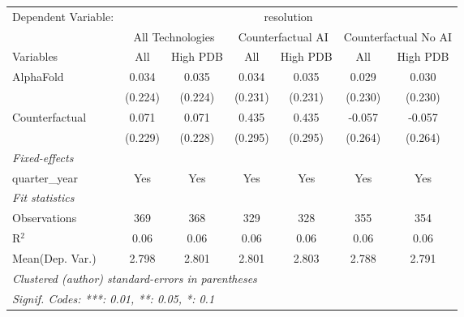 \begingroup
\centering
\begin{tabular}{lcccccc}
   \tabularnewline \midrule \midrule
   Dependent Variable: & \multicolumn{6}{c}{resolution}\\
 & \multicolumn{2}{c}{All Technologies} & \multicolumn{2}{c}{Counterfactual AI} & \multicolumn{2}{c}{Counterfactual No AI} \\
\cmidrule(lr){1-1}\cmidrule(lr){2-3} \cmidrule(lr){4-5} \cmidrule(lr){6-7}
Variables & \multicolumn{1}{c}{All} & \multicolumn{1}{c}{High PDB} & \multicolumn{1}{c}{All} & \multicolumn{1}{c}{High PDB} & \multicolumn{1}{c}{All} & \multicolumn{1}{c}{High PDB} \\
\cmidrule(lr){1-1}\cmidrule(lr){2-2} \cmidrule(lr){3-3} \cmidrule(lr){4-4} \cmidrule(lr){5-5} \cmidrule(lr){6-6} \cmidrule(lr){7-7}
   AlphaFold      & 0.034   & 0.035   & 0.034   & 0.035   & 0.029   & 0.030\\   
                  & (0.224) & (0.224) & (0.231) & (0.231) & (0.230) & (0.230)\\   
   Counterfactual & 0.071   & 0.071   & 0.435   & 0.435   & -0.057  & -0.057\\   
                  & (0.229) & (0.228) & (0.295) & (0.295) & (0.264) & (0.264)\\   
   \midrule
   \emph{Fixed-effects}\\
   quarter\_year  & Yes     & Yes     & Yes     & Yes     & Yes     & Yes\\  
   \midrule
   \emph{Fit statistics}\\
   Observations   & 369     & 368     & 329     & 328     & 355     & 354\\  
   R$^2$          & 0.06    & 0.06    & 0.06    & 0.06    & 0.06    & 0.06\\  
Mean(Dep. Var.) & 2.798 & 2.801 & 2.801 & 2.803 & 2.788 & 2.791 \\
   \midrule \midrule
   \multicolumn{7}{l}{\emph{Clustered (author) standard-errors in parentheses}}\\
   \multicolumn{7}{l}{\emph{Signif. Codes: ***: 0.01, **: 0.05, *: 0.1}}\\
\end{tabular}
\par\endgroup
